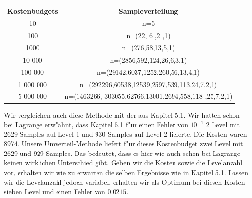\begin{center}
\begin{tabular}{|c|c|}
Kostenbudgets & Sampleverteilung \\
 \hline
10 & n=5 \\
\hline
100& n=(22, 6 ,2 ,1) \\
\hline
1000& n=(276,58,13,5,1) \\
\hline
10 000& n=(2856,592,124,26,6,3,1) \\
\hline
100 000& n=(29142,6037,1252,260,56,13,4,1) \\
\hline
1 000 000&  n=(292296,60538,12539,2597,539,113,24,7,2,1) \\
\hline
5 000 000& n=(1463266, 303055,62766,13001,2694,558,118 ,25,7,2,1)
 \\
\end{tabular}
\end{center}\vspace{0,3cm}
Wir vergleichen auch diese Methode mit der aus Kapitel 5.1. Wir hatten schon bei Lagrange erw"ahnt, dass Kapitel 5.1 f"ur einen Fehler von $10^{-1}$ 2 Level mit 2629 Samples auf Level 1 und 930 Samples auf Level 2 lieferte. Die Kosten waren 8974.
Unsere Umverteil-Methode liefert f"ur dieses Kostenbudget zwei Level  mit 2629 und 929 Samples. Das bedeutet, dass es hier wie auch schon bei Lagrange  keinen wirklichen Unterschied gibt. Geben wir die Kosten sowie die Levelanzahl vor, erhalten wir wie zu erwarten die selben Ergebnisse wie in Kapitel 5.1. Lassen wir die Levelanzahl jedoch variabel, erhalten wir als Optimum bei diesen Kosten sieben Level und einen Fehler von $0.0215$. 

